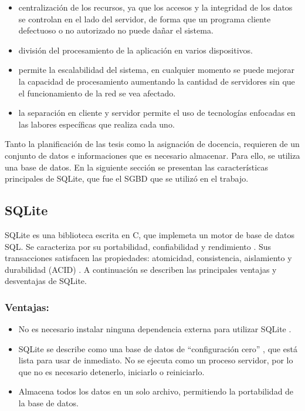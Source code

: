 \begin{itemize}
    \item centralización de los recursos, ya que los accesos y la integridad de los datos se controlan en el lado del servidor, de forma que un programa cliente defectuoso o no autorizado no puede dañar el sistema.
    \item división del procesamiento de la aplicación en varios dispositivos.
    \item permite la escalabilidad del sistema, en cualquier momento se puede mejorar la capacidad de procesamiento aumentando la cantidad de servidores sin que el funcionamiento de la red se vea afectado.
    \item la separación en cliente y servidor permite el uso de tecnologías enfocadas en las labores específicas que realiza cada uno. 
\end{itemize}
 

Tanto la planificación de las tesis como la asignación de docencia, requieren de un 
conjunto de datos e informaciones que es necesario almacenar. Para ello, se 
utiliza una base de datos. En la siguiente sección se presentan las características principales 
de SQLite, que fue el SGBD que se utilizó en el trabajo.

\subsection{SQLite}

SQLite es una biblioteca escrita en C, que implemeta un motor de base de datos SQL.
Se caracteriza por su portabilidad, confiabilidad \cite{sqlite_high_reliability} y rendimiento \cite{sqlite_fast}. Sus transacciones 
satisfacen las propiedades: atomicidad, consistencia, aislamiento y durabilidad (ACID) \cite{acid}. A continuación se describen las principales ventajas 
y desventajas de SQLite.

\subsubsection{Ventajas:}

\begin{itemize}
    \item No es necesario instalar ninguna dependencia externa para utilizar SQLite \cite{sqlite_self_contained}.    
    \item SQLite se describe como una base de datos de ``configuración cero'' \cite{sqlite_about}, que está lista para 
    usar de inmediato. No se ejecuta como un proceso servidor, por lo que no es necesario detenerlo,
    iniciarlo o reiniciarlo.
    \item Almacena todos los datos en un solo archivo, permitiendo la portabilidad de la base de datos. 
\end{itemize}



